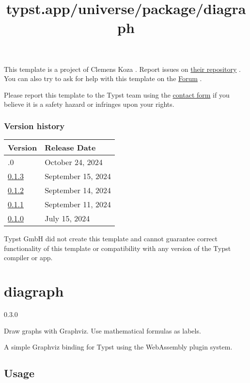 This template is a project of Clemens Koza . Report issues on
\href{https://github.com/TGM-HIT/typst-diploma-thesis}{their repository}
. You can also try to ask for help with this template on the
\href{https://forum.typst.app}{Forum} .

Please report this template to the Typst team using the
\href{https://typst.app/contact}{contact form} if you believe it is a
safety hazard or infringes upon your rights.

\label{versions}
\subsubsection{Version history}\label{version-history}

\begin{longtable}[]{@{}ll@{}}
\toprule\noalign{}
Version & Release Date \\
\midrule\noalign{}
\endhead
\bottomrule\noalign{}
\endlastfoot
0.2.0 & October 24, 2024 \\
\href{https://typst.app/universe/package/tgm-hit-thesis/0.1.3/}{0.1.3} &
September 15, 2024 \\
\href{https://typst.app/universe/package/tgm-hit-thesis/0.1.2/}{0.1.2} &
September 14, 2024 \\
\href{https://typst.app/universe/package/tgm-hit-thesis/0.1.1/}{0.1.1} &
September 11, 2024 \\
\href{https://typst.app/universe/package/tgm-hit-thesis/0.1.0/}{0.1.0} &
July 15, 2024 \\
\end{longtable}

Typst GmbH did not create this template and cannot guarantee correct
functionality of this template or compatibility with any version of the
Typst compiler or app.


\title{typst.app/universe/package/diagraph}

\label{banner}
\section{diagraph}\label{diagraph}

{ 0.3.0 }

Draw graphs with Graphviz. Use mathematical formulas as labels.

\label{readme}
A simple Graphviz binding for Typst using the WebAssembly plugin system.

\subsection{Usage}\label{usage}

